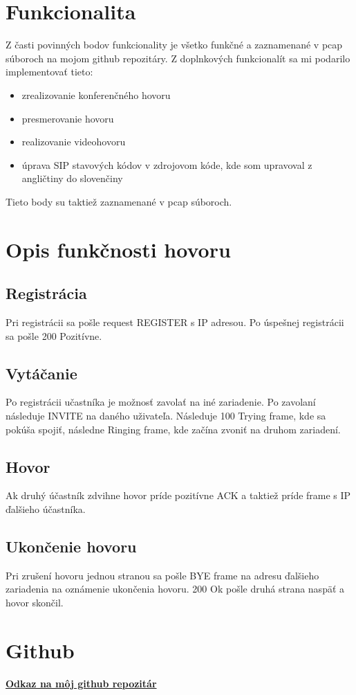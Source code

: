 \documentclass[12pt, oneside]{article}
\begin{document}
\section{Funkcionalita}
Z časti povinných bodov funkcionality je všetko funkčné a zaznamenané v pcap súboroch na mojom github repozitáry.
\newline
Z doplnkových funkcionalít sa mi podarilo implementovať tieto:
\begin{itemize}
  \item zrealizovanie konferenčného hovoru
  \item presmerovanie hovoru
  \item realizovanie videohovoru
  \item úprava SIP stavových kódov v zdrojovom kóde, kde som upravoval z angličtiny do slovenčiny
\end{itemize}
Tieto body su taktiež zaznamenané v pcap súboroch.

\section{Opis funkčnosti hovoru}
\subsection{Registrácia}
Pri registrácii sa pošle request REGISTER s IP adresou. Po úspešnej registrácii sa pošle 200 Pozitívne.
\subsection{Vytáčanie}
Po registrácii učastníka je možnosť zavolať na iné zariadenie. Po zavolaní následuje INVITE na daného uživateľa.
Následuje 100 Trying frame, kde sa pokúša spojiť, následne Ringing frame, kde začína zvoniť na druhom zariadení.
\subsection{Hovor}
Ak druhý účastník zdvihne hovor príde pozitívne ACK a taktiež príde frame s IP ďalšieho účastníka.
\subsection{Ukončenie hovoru}
Pri zrušení hovoru jednou stranou sa pošle BYE frame na adresu ďalšieho zariadenia na oznámenie ukončenia hovoru. 200 Ok pošle druhá strana naspäť a hovor skončil.

\section{Github}
\textbf{\href{https://github.com/nemo260/sip-mtaa}{Odkaz na môj github repozitár} }
\end{document}
